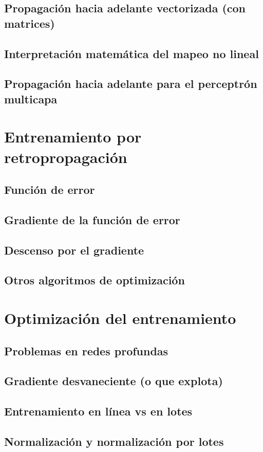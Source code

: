 \documentclass[12pt,openany]{book}
\begin{document}
\section{Propagación hacia adelante vectorizada (con matrices)}
\section{Interpretación matemática del mapeo no lineal}
\section{Propagación hacia adelante para el perceptrón multicapa}


\chapter{Entrenamiento por retropropagación}
\section{Función de error}
\section{Gradiente de la función de error}
\section{Descenso por el gradiente}
\section{Otros algoritmos de optimización}

\chapter{Optimización del entrenamiento} 
\section{Problemas en redes profundas}
\section{Gradiente desvaneciente (o que explota) }
\section{Entrenamiento en línea vs en lotes}
\section{Normalización y normalización por lotes}
\end{document}
